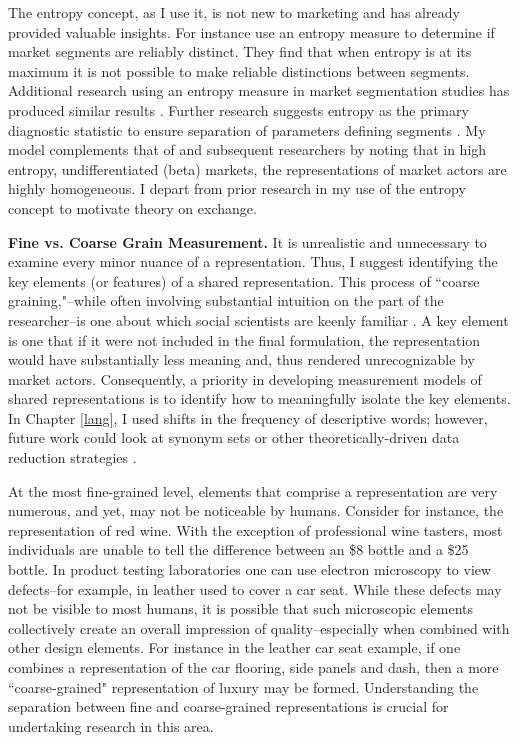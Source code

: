 The entropy concept, as I use it, is not new to marketing and has already provided valuable insights. For instance \citet{ramaswamy1993} use an entropy measure to determine if market segments are reliably distinct. They find that when entropy is at its maximum it is not possible to make reliable distinctions between segments. Additional research using an entropy measure in market segmentation studies has produced similar results \citep{desarbo1995, kamakura1995, hofstede1999}. Further research suggests entropy as the primary diagnostic statistic to ensure separation of parameters defining segments \citep{kamakura1995}. My model complements that of \citet{ramaswamy1993} and subsequent researchers by noting that in high entropy, undifferentiated (beta) markets, the representations of market actors are highly homogeneous. I depart from prior research in my use of the entropy concept to motivate theory on exchange.

\textbf{Fine vs. Coarse Grain Measurement.}
It is unrealistic and unnecessary to examine every minor nuance of a representation. Thus, I suggest identifying the key elements (or features) of a shared representation. This process of ``coarse graining,"--while often involving substantial intuition on the part of the researcher--is one about which social scientists are keenly familiar \citep{klingenstein2014, stewart1981}. A key element is one that if it were not included in the final formulation, the representation would have substantially less meaning and, thus rendered unrecognizable by market actors. Consequently, a priority in developing measurement models of shared representations is to identify how to meaningfully isolate the key elements. In Chapter \ref{lang}, I used shifts in the frequency of descriptive words; however, future work could look at synonym sets or other theoretically-driven data reduction strategies \citep{klingenstein2014}.

At the most fine-grained level, elements that comprise a representation are very numerous, and yet, may not be noticeable by humans. Consider for instance, the representation of red wine. With the exception of professional wine tasters, most individuals are unable to tell the difference between an \$8 bottle and a \$25 bottle. In product testing laboratories one can use electron microscopy to view defects--for example, in leather used to cover a car seat. While these defects may not be visible to most humans, it is possible that such microscopic elements collectively create an overall impression of quality--especially when combined with other design elements. For instance in the leather car seat example, if one combines a representation of the car flooring, side panels and dash, then a more ``coarse-grained" representation of luxury may be formed. Understanding the separation between fine and coarse-grained representations is crucial for undertaking research in this area.

